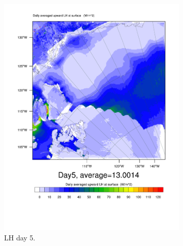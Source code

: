 \begin{figure}
	\begin{subfigure}{0.48\textwidth}
		\centering
		\includegraphics[width=\textwidth]{results/control/LH_Day5.pdf}
		\caption{LH day 5.}
		\label{subfig:lh_r1Day5}
	\end{subfigure}
	\quad
	\begin{subfigure}{0.48\textwidth}
		\centering

\end{subfigure}
\end{figure}
